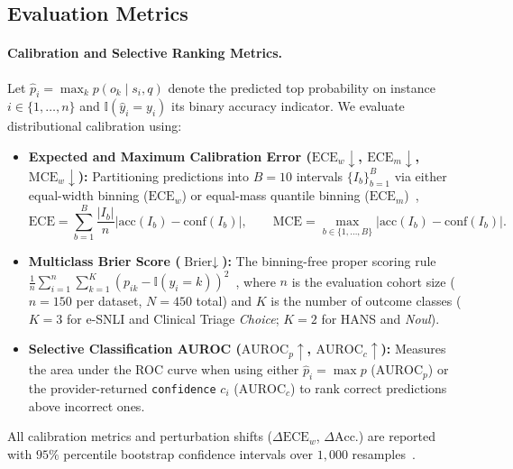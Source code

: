 \documentclass[10pt]{article}
\begin{document}
\subsection{Evaluation Metrics}
\label{sec:metrics}

\paragraph{Calibration and Selective Ranking Metrics.}
Let $\hat{p}_i = \max_k p(o_k \mid s_i, q)$ denote the predicted top probability on instance $i \in \{1,\dots,n\}$ and $\mathbb{I}(\hat{y}_i = y_i)$ its binary accuracy indicator. We evaluate distributional calibration using:
\begin{itemize}
\item \textbf{Expected and Maximum Calibration Error ($\text{ECE}_w \downarrow$, $\text{ECE}_m \downarrow$, $\text{MCE}_w \downarrow$):} Partitioning predictions into $B = 10$ intervals $\{I_b\}_{b=1}^B$ via either equal-width binning ($\text{ECE}_w$) or equal-mass quantile binning ($\text{ECE}_m$)~\cite{naeini2015,nixon2019},
\begin{equation}
\text{ECE} = \sum_{b=1}^B \frac{|I_b|}{n} \big|\text{acc}(I_b) - \text{conf}(I_b)\big|, \qquad \text{MCE} = \max_{b \in \{1,\dots,B\}} \big|\text{acc}(I_b) - \text{conf}(I_b)\big|.
\end{equation}
\item \textbf{Multiclass Brier Score ($\text{Brier} \downarrow$):} The binning-free proper scoring rule $\frac{1}{n} \sum_{i=1}^n \sum_{k=1}^K (p_{ik} - \mathbb{I}(y_i = k))^2$~\cite{brier1950}, where $n$ is the evaluation cohort size ($n=150$ per dataset, $N=450$ total) and $K$ is the number of outcome classes ($K=3$ for e-SNLI and Clinical Triage \emph{Choice}; $K=2$ for HANS and \emph{Noul}).
\item \textbf{Selective Classification AUROC ($\text{AUROC}_p \uparrow$, $\text{AUROC}_c \uparrow$):} Measures the area under the ROC curve when using either $\hat{p}_i = \max p$ ($\text{AUROC}_p$) or the provider-returned \texttt{confidence} $c_i$ ($\text{AUROC}_c$) to rank correct predictions above incorrect ones.
\end{itemize}
All calibration metrics and perturbation shifts ($\Delta\text{ECE}_w$, $\Delta\text{Acc.}$) are reported with $95\%$ percentile bootstrap confidence intervals over $1{,}000$ resamples~\cite{efron1979}.
\end{document}
